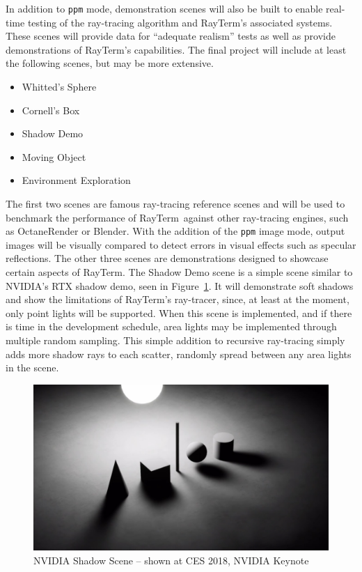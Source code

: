 \documentclass[11pt]{article}
\newcommand{\name}{{\sc RayTerm}}
\begin{document}
In addition to \texttt{ppm} mode, demonstration scenes will also be built to enable real-time testing of the ray-tracing algorithm and \name's associated systems.
These scenes will provide data for ``adequate realism'' tests as well as provide demonstrations of \name's capabilities.
The final project will include at least the following scenes, but may be more extensive.

\begin{itemize}
  \setlength\itemsep{-0.25em}
  \item Whitted's Sphere
  \item Cornell's Box
  \item Shadow Demo
  \item Moving Object
  \item Environment Exploration
\end{itemize}

The first two scenes are famous ray-tracing reference scenes and will be used to benchmark the performance of \name\ against other ray-tracing engines, such as OctaneRender or Blender.
With the addition of the {\texttt{ppm}} image mode, output images will be visually compared to detect errors in visual effects such as specular reflections.
The other three scenes are demonstrations designed to showcase certain aspects of \name.
The Shadow Demo scene is a simple scene similar to NVIDIA's RTX shadow demo, seen in Figure~\ref{fig:nvidia_shadows}.
It will demonstrate soft shadows and show the limitations of \name's ray-tracer, since, at least at the moment, only point lights will be supported.
When this scene is implemented, and if there is time in the development schedule, area lights may be implemented through multiple random sampling.
This simple addition to recursive ray-tracing simply adds more shadow rays to each scatter, randomly spread between any area lights in the scene.

\begin{figure}[htb]
  \centering
  \includegraphics[width=\textwidth]{resources/nvidia_shadows}
  \caption{NVIDIA Shadow Scene -- shown at CES 2018, NVIDIA Keynote}
  \label{fig:nvidia_shadows}
\end{figure}
\end{document}
